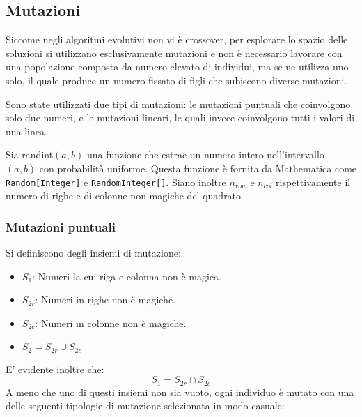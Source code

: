 \documentclass[italian,twoside,twocolumn]{article}
\begin{document}
\subsection{Mutazioni}
Siccome negli algoritmi evolutivi non vi è crossover, per esplorare lo spazio delle soluzioni si utilizzano esclusivamente mutazioni e non è necessario lavorare con una popolazione composta da numero elevato di individui, ma se ne utilizza uno solo, il quale produce un numero fissato di figli che subiscono diverse mutazioni.

Sono state utilizzati due tipi di mutazioni: le mutazioni puntuali che coinvolgono solo due numeri, e le mutazioni lineari, le quali invece coinvolgono tutti i valori di una linea.

Sia randint$ (a,b) $ una funzione che estrae un numero intero nell'intervallo $ (a,b) $ con probabilità uniforme. Questa funzione è fornita da Mathematica come \texttt{Random[Integer]} e \texttt{RandomInteger[]}. Siano inoltre $ n_{row} $ e $ n_{col} $ rispettivamente il numero di righe e di colonne non magiche del quadrato.

\subsubsection{Mutazioni puntuali}
Si definiscono degli insiemi di mutazione:
\begin{itemize}
	\item $ S_1 $:  Numeri la cui riga e colonna non è magica.
	\item $ S_{2r} $: Numeri in righe non è magiche.
	\item $ S_{2c} $: Numeri in colonne non è magiche.
	\item $ S_{2} = S_{2r} \cup S_{2c} $
\end{itemize}
E' evidente inoltre che:
\[S_1 = S_{2r} \cap S_{2c} \]
A meno che uno di questi insiemi non sia vuoto, ogni individuo è mutato con una delle seguenti tipologie di mutazione selezionata in modo casuale:
\end{document}
